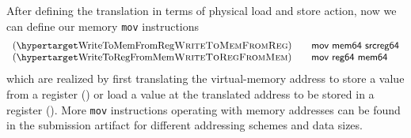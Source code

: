 After defining the translation in terms of physical load and store action, now we can define our memory \lstinline|mov| instructions
\[
\begin{array}{l}
  \hbox{(\TirNameStyle{WriteToMemFromReg})} \qquad
  \textsf{mov mem64 srcreg64} \\
  \hbox{(\TirNameStyle{WriteToRegFromMem})} \qquad 
  \textsf{mov reg64 mem64}
  \end{array}
  \]
  which are realized by first translating the virtual-memory address to store a value from a register () or load a value at the translated address to be stored in a register (). More \lstinline|mov| instructions operating with memory addresses can be found in the submission artifact for different addressing schemes and data sizes.


